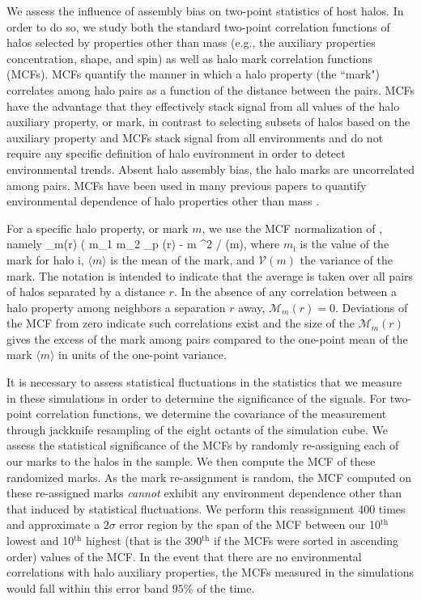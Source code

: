 \documentclass[usenatbib]{mnras}
\begin{document}
We assess the influence of assembly bias on two-point statistics of host halos. In order to do so, we 
study both the standard two-point correlation functions of halos selected by properties other than mass 
(e.g., the auxiliary properties concentration, shape, and spin) as well as halo mark correlation functions
(MCFs). MCFs quantify the manner in which a halo property (the ``mark") correlates among halo pairs as a function
of the distance between the pairs. MCFs have the advantage that they effectively stack signal from all values of 
the halo auxiliary property, or mark, in contrast to selecting subsets of halos based on the auxiliary property and 
MCFs stack signal from all environments and do not require any specific definition of halo environment in order 
to detect environmental trends. Absent halo assembly bias, the halo marks are uncorrelated among pairs. 
MCFs have been used in many previous papers to quantify environmental dependence of halo 
properties other than mass \citep{sheth_tormen04,harker_etal06,wechsler_etal06,mao_etal15} . 


For a specific halo property, or mark $m$, we use the MCF normalization of \citet{wechsler_etal06}, namely 
%
\beq
{}_m(r) \equiv ( \langle m_1 m_2 \rangle_p (r) - \langle m \rangle^2 / (m),
\eeq
%
where $m_{\mathrm{i}}$ is the value of the mark for halo $\mathrm{i}$, $\langle m \rangle$ is the mean of the
mark, and $\mathcal{V}(m)$ the variance of the mark. The notation is intended to indicate that the average is
taken over all pairs of halos separated by a distance $r$. In the absence of any correlation between a halo
property among neighbors a separation $r$ away, $\mathcal{M}_m(r) = 0$. Deviations of the MCF from
zero indicate such correlations exist and the size of the $\mathcal{M}_m(r)$ gives the excess of the mark among
pairs compared to the one-point mean of the mark $\langle m\rangle$ in units of the one-point variance. 


It is necessary to assess statistical fluctuations in the statistics that we measure in these simulations in
order to determine the significance of the signals. For two-point correlation functions, we determine the
covariance of the measurement through jackknife resampling of the eight octants of the simulation cube. We assess
the statistical significance of the MCFs by randomly re-assigning each of our marks to the halos in the sample. 
We then compute the MCF of these randomized marks. As the mark re-assignment is random, 
the MCF computed on these re-assigned marks {\em cannot} exhibit any 
environment dependence other than that induced by statistical fluctuations. 
We perform this reassignment 400 times and approximate a $2\sigma$ error region by 
the span of the MCF between our 10$^\mathrm{th}$ lowest and 10$^\mathrm{th}$ highest (that is the
390$^\mathrm{th}$ if the MCFs were sorted in ascending order) values of the MCF. In the event that there are no
environmental correlations with halo auxiliary properties, the MCFs measured in the simulations would fall within
this error band $95\%$ of the time. 
\end{document}
